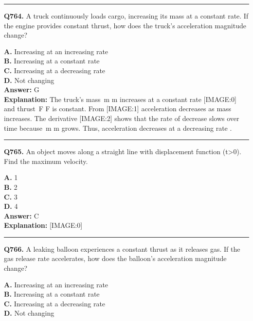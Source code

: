 \documentclass[12pt]{article}
\begin{document}
\hrule
\vspace{1em}


\noindent
\textbf{Q764.} A truck continuously loads cargo, increasing its mass at a constant rate. If the engine provides constant thrust, how does the truck's acceleration magnitude change?



\textbf{A.} Increasing at an increasing rate \\
\textbf{B.} Increasing at a constant rate \\
\textbf{C.} Increasing at a decreasing rate \\
\textbf{D.} Not changing \\

\textbf{Answer:} G \\
\textbf{Explanation:} The truck's mass m
m
increases at a constant rate
[IMAGE:0]
and thrust F
F
is constant. From
[IMAGE:1]
acceleration decreases as mass increases. The derivative
[IMAGE:2]
shows that the rate of decrease slows over time because m
m
grows. Thus, acceleration decreases at a decreasing rate
.

\hrule
\vspace{1em}


\noindent
\textbf{Q765.} An object moves along a straight line with displacement function
(t>0). Find the maximum velocity.



\textbf{A.} 1 \\
\textbf{B.} 2 \\
\textbf{C.} 3 \\
\textbf{D.} 4 \\

\textbf{Answer:} C \\
\textbf{Explanation:} [IMAGE:0]

\hrule
\vspace{1em}


\noindent
\textbf{Q766.} A leaking balloon experiences a constant thrust as it releases gas. If the gas release rate accelerates, how does the balloon's acceleration magnitude change?



\textbf{A.} Increasing at an increasing rate \\
\textbf{B.} Increasing at a constant rate \\
\textbf{C.} Increasing at a decreasing rate \\
\textbf{D.} Not changing \\
\end{document}
